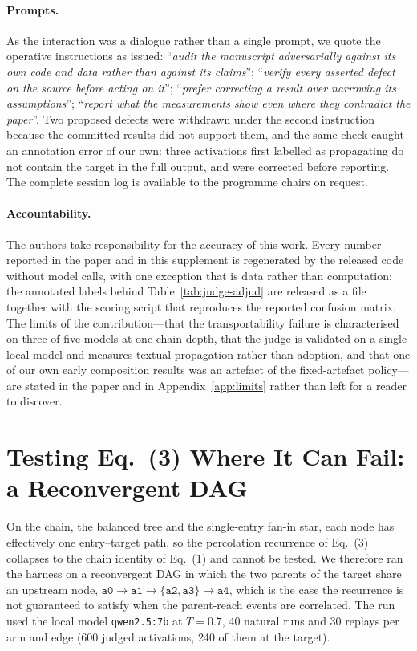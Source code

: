 \documentclass[sigconf,anonymous]{aamas}
\begin{document}
\paragraph{Prompts.} As the interaction was a dialogue rather than a single prompt, we
quote the operative instructions as issued: ``\emph{audit the manuscript adversarially
against its own code and data rather than against its claims}''; ``\emph{verify every
asserted defect on the source before acting on it}'';
``\emph{prefer correcting a result over narrowing its assumptions}'';
``\emph{report what the measurements show even where they contradict the paper}''. Two
proposed defects were withdrawn under the second instruction because the committed
results did not support them, and the same check caught an annotation error of our own:
three activations first labelled as propagating do not contain the target in the full
output, and were corrected before reporting. The complete session log is available to
the programme chairs on request.

\paragraph{Accountability.} The authors take responsibility for the accuracy of this
work. Every number reported in the paper and in this supplement is regenerated by the
released code without model calls, with one exception that is data rather than
computation: the annotated labels behind Table~\ref{tab:judge-adjud} are released as a
file together with the scoring script that reproduces the reported confusion matrix.
The limits of the contribution---that the transportability failure is characterised on
three of five models at one chain depth, that the judge is validated on a single local
model and measures textual propagation rather than adoption, and that one of our own
early composition results was an artefact of the fixed-artefact policy---are stated in
the paper and in Appendix~\ref{app:limits} rather than left for a reader to discover.

\section{Testing Eq.~(3) Where It Can Fail: a Reconvergent DAG}
\label{app:reconvergent}

On the chain, the balanced tree and the single-entry fan-in star, each node has
effectively one entry--target path, so the percolation recurrence of Eq.~(3) collapses
to the chain identity of Eq.~(1) and cannot be tested. We therefore ran the harness on
a reconvergent DAG in which the two parents of the target share an upstream node,
$\texttt{a0} \!\to\! \texttt{a1} \!\to\! \{\texttt{a2}, \texttt{a3}\} \!\to\! \texttt{a4}$,
which is the case the recurrence is not guaranteed to satisfy when the parent-reach
events are correlated. The run used the local model \texttt{qwen2.5:7b} at $T = 0.7$,
40 natural runs and 30 replays per arm and edge (600 judged activations, 240 of them at
the target).
\end{document}
